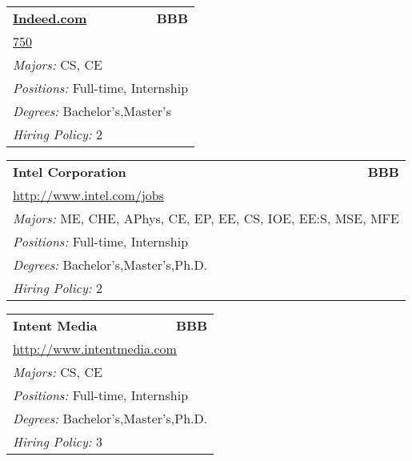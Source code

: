 \documentclass[twoside]{article}
\begin{document}
\begin{center}
\begin{multicols}{3}
\begin{FlushLeft}
\begin{minipage}{\columnwidth}
\end{minipage}
 
\begin{minipage}{\columnwidth}\begin{tabularx}{.95\columnwidth}{Xr}
                 {\Large\bf \url{Indeed.com}} & {\Large\bf BBB}\\
    \multicolumn{2}{p{.95\columnwidth}}{\url{750}}\\
    \multicolumn{2}{p{.95\columnwidth}}{\emph{Majors:} CS, CE}\\
    \multicolumn{2}{p{.95\columnwidth}}{\emph{Positions:} Full-time, Internship}\\
    \multicolumn{2}{p{.95\columnwidth}}{\emph{Degrees:} Bachelor's,Master's}\\
    \multicolumn{2}{p{.95\columnwidth}}{\emph{Hiring Policy:} 2}\\
    \end{tabularx}
    
\end{minipage}
 
\begin{minipage}{\columnwidth}\begin{tabularx}{.95\columnwidth}{Xr}
                 {\Large\bf Intel Corporation} & {\Large\bf BBB}\\
    \multicolumn{2}{p{.95\columnwidth}}{\url{http://www.intel.com/jobs}}\\
    \multicolumn{2}{p{.95\columnwidth}}{\emph{Majors:} ME, CHE, APhys, CE, EP, EE, CS, IOE, EE:S, MSE, MFE}\\
    \multicolumn{2}{p{.95\columnwidth}}{\emph{Positions:} Full-time, Internship}\\
    \multicolumn{2}{p{.95\columnwidth}}{\emph{Degrees:} Bachelor's,Master's,Ph.D.}\\
    \multicolumn{2}{p{.95\columnwidth}}{\emph{Hiring Policy:} 2}\\
    \end{tabularx}
    
\end{minipage}
 
\begin{minipage}{\columnwidth}\begin{tabularx}{.95\columnwidth}{Xr}
                 {\Large\bf Intent Media} & {\Large\bf BBB}\\
    \multicolumn{2}{p{.95\columnwidth}}{\url{http://www.intentmedia.com}}\\
    \multicolumn{2}{p{.95\columnwidth}}{\emph{Majors:} CS, CE}\\
    \multicolumn{2}{p{.95\columnwidth}}{\emph{Positions:} Full-time, Internship}\\
    \multicolumn{2}{p{.95\columnwidth}}{\emph{Degrees:} Bachelor's,Master's,Ph.D.}\\
    \multicolumn{2}{p{.95\columnwidth}}{\emph{Hiring Policy:} 3}\\
    \end{tabularx}
    

\end{minipage}
\end{FlushLeft}
\end{multicols}
\end{center}
\end{document}
